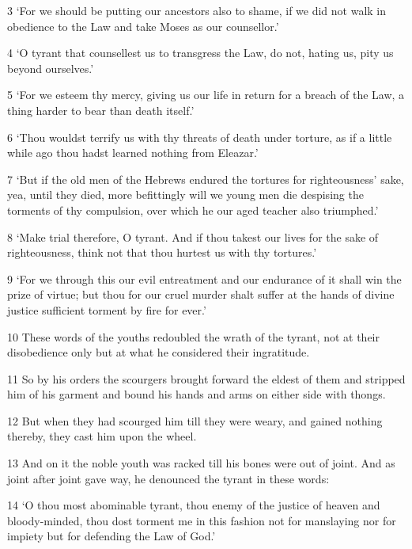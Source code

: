 \par 3 ‘For we should be putting our ancestors also to shame, if we did not walk in obedience to the Law and take Moses as our counsellor.’

\par 4 ‘O tyrant that counsellest us to transgress the Law, do not, hating us, pity us beyond ourselves.’

\par 5 ‘For we esteem thy mercy, giving us our life in return for a breach of the Law, a thing harder to bear than death itself.’

\par 6 ‘Thou wouldst terrify us with thy threats of death under torture, as if a little while ago thou hadst learned nothing from Eleazar.’

\par 7 ‘But if the old men of the Hebrews endured the tortures for righteousness' sake, yea, until they died, more befittingly will we young men die despising the torments of thy compulsion, over which he our aged teacher also triumphed.’

\par 8 ‘Make trial therefore, O tyrant. And if thou takest our lives for the sake of righteousness, think not that thou hurtest us with thy tortures.’

\par 9 ‘For we through this our evil entreatment and our endurance of it shall win the prize of virtue; but thou for our cruel murder shalt suffer at the hands of divine justice sufficient torment by fire for ever.’

\par 10 These words of the youths redoubled the wrath of the tyrant, not at their disobedience only but at what he considered their ingratitude.

\par 11 So by his orders the scourgers brought forward the eldest of them and stripped him of his garment and bound his hands and arms on either side with thongs.

\par 12 But when they had scourged him till they were weary, and gained nothing thereby, they cast him upon the wheel.

\par 13 And on it the noble youth was racked till his bones were out of joint. And as joint after joint gave way, he denounced the tyrant in these words:

\par 14 ‘O thou most abominable tyrant, thou enemy of the justice of heaven and bloody-minded, thou dost torment me in this fashion not for manslaying nor for impiety but for defending the Law of God.’

